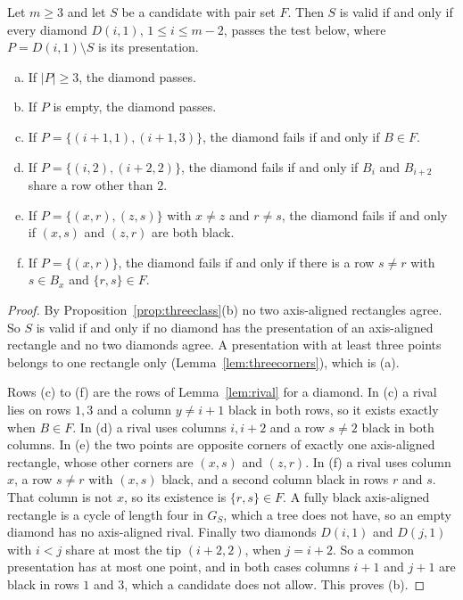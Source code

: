\begin{lemma}\label{lem:diamond}
Let $m\ge3$ and let $S$ be a candidate with pair set $F$. Then $S$ is valid if and only if every
diamond $D(i,1)$, $1\le i\le m-2$, passes the test below, where $P=D(i,1)\setminus S$ is its
presentation.
\begin{enumerate}[(a)]
\item If $|P|\ge3$, the diamond passes.
\item If $P$ is empty, the diamond passes.
\item If $P=\{(i+1,1),(i+1,3)\}$, the diamond fails if and only if $B\in F$.
\item If $P=\{(i,2),(i+2,2)\}$, the diamond fails if and only if $B_i$ and $B_{i+2}$ share a
row other than $2$.
\item If $P=\{(x,r),(z,s)\}$ with $x\ne z$ and $r\ne s$, the diamond fails if and only if
$(x,s)$ and $(z,r)$ are both black.
\item If $P=\{(x,r)\}$, the diamond fails if and only if there is a row $s\ne r$ with $s\in B_x$
and $\{r,s\}\in F$.
\end{enumerate}
\end{lemma}

\begin{proof}
By Proposition~\ref{prop:threeclass}(b) no two axis-aligned rectangles agree. So $S$ is valid
if and only if no diamond has the presentation of an axis-aligned rectangle and no two
diamonds agree. A presentation with at least three points belongs to one rectangle only
(Lemma~\ref{lem:threecorners}), which is (a).

Rows (c) to (f) are the rows of Lemma~\ref{lem:rival} for a diamond. In (c) a rival lies on
rows $1,3$ and a column $y\ne i+1$ black in both rows, so it exists exactly when $B\in F$. In
(d) a rival uses columns $i,i+2$ and a row $s\ne2$ black in both columns. In (e) the two
points are opposite corners of exactly one axis-aligned rectangle, whose other corners are
$(x,s)$ and $(z,r)$. In (f) a rival uses column $x$, a row $s\ne r$ with $(x,s)$ black, and a
second column black in rows $r$ and $s$. That column is not $x$, so its existence is
$\{r,s\}\in F$. A fully black axis-aligned rectangle is a cycle of length four in $G_S$,
which a tree does not have, so an empty diamond has no axis-aligned rival. Finally two
diamonds $D(i,1)$ and $D(j,1)$ with $i<j$ share at most the tip $(i+2,2)$, when $j=i+2$. So
a common presentation has at most one point, and in both cases columns $i+1$ and $j+1$ are
black in rows $1$ and $3$, which a candidate does not allow. This proves (b).
\end{proof}

